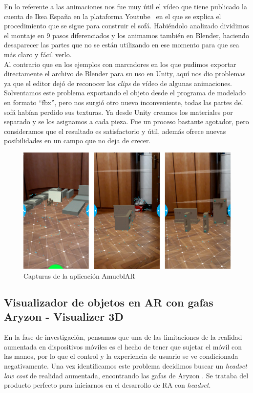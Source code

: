 En lo referente a las animaciones nos fue muy útil el vídeo que tiene publicado la cuenta de Ikea España en la plataforma Youtube~\cite{IkeaYT} en el que se explica el procedimiento que se sigue para construir el sofá. Habiéndolo analizado dividimos el montaje en 9 pasos diferenciados y los animamos también en Blender, haciendo desaparecer las partes que no se están utilizando en ese momento para que sea más claro y fácil verlo.\\

Al contrario que en los ejemplos con marcadores en los que pudimos exportar directamente el archivo de Blender para su uso en Unity, aquí nos dio problemas ya que el editor dejó de reconocer los \textit{clips} de vídeo de algunas animaciones. Solventamos este problema exportando el objeto desde el programa de modelado en formato ``fbx'', pero nos surgió otro nuevo inconveniente, todas las partes del sofá habían perdido sus texturas. Ya desde Unity creamos los materiales por separado y se los asignamos a cada pieza.
Fue un proceso bastante agotador, pero consideramos que el resultado es satisfactorio y útil, además ofrece nuevas posibilidades en un campo que no deja de crecer.\\

\begin{figure}[H]
    \centering
    \includegraphics[width=\linewidth]{Images/amueblar.jpg}
    \caption{Capturas de la aplicación AmueblAR}
    \label{mueblAR}
\end{figure}

\subsection{Visualizador de objetos en AR con gafas Aryzon - Visualizer 3D}
En la fase de investigación, pensamos que una de las limitaciones de la realidad aumentada en dispositivos móviles es el hecho de tener que sujetar el móvil con las manos, por lo que el control y la experiencia de usuario se ve condicionada negativamente. Una vez identificamos este problema decidimos buscar un \textit{headset low cost} de realidad aumentada, encontrando las gafas de Aryzon \cite{Aryzon}. Se trataba del producto perfecto para iniciarnos en el desarrollo de RA con \textit{headset}.\\

